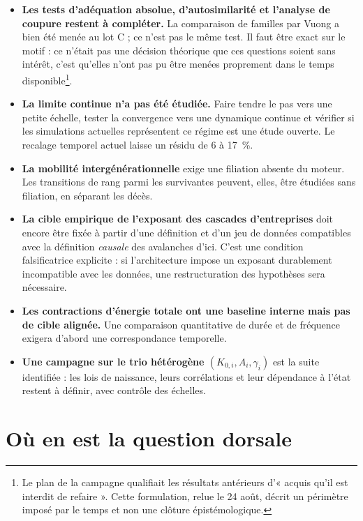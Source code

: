 \documentclass[11pt,a4paper]{article}
\begin{document}
\begin{itemize}
\item \textbf{Les tests d'adéquation absolue, d'autosimilarité et l'analyse
      de coupure restent à compléter.} La comparaison de familles par Vuong
      a bien été menée au lot C ; ce n'est pas le même test. Il faut être
      exact sur le motif : ce n'était pas une décision théorique que ces
      questions soient sans intérêt, c'est qu'elles n'ont pas pu être menées
      proprement dans le temps disponible\footnote{Le plan de la campagne
      qualifiait les résultats antérieurs d'« acquis qu'il est interdit de
      refaire ». Cette formulation, relue le 24 août, décrit un périmètre
      imposé par le temps et non une clôture épistémologique.}.
\item \textbf{La limite continue n'a pas été étudiée.} Faire tendre le pas vers
      une petite échelle, tester la convergence vers une dynamique continue et
      vérifier si les simulations actuelles représentent ce régime est une
      étude ouverte. Le recalage temporel actuel laisse un résidu de 6 à 17~\%.
\item \textbf{La mobilité intergénérationnelle} exige une filiation absente
      du moteur. Les transitions de rang parmi les survivantes peuvent,
      elles, être étudiées sans filiation, en séparant les décès.
\item \textbf{La cible empirique de l'exposant des cascades d'entreprises}
      doit encore être fixée à partir d'une définition et d'un jeu de données
      compatibles avec la définition \emph{causale} des avalanches d'ici. C'est
      une condition falsificatrice explicite : si l'architecture impose un
      exposant durablement incompatible avec les données, une restructuration
      des hypothèses sera nécessaire.
\item \textbf{Les contractions d'énergie totale ont une baseline interne mais
      pas de cible alignée.} Une comparaison quantitative de durée et de
      fréquence exigera d'abord une correspondance temporelle.
\item \textbf{Une campagne sur le trio hétérogène $(K_{0,i},A_i,\gamma_i)$}
      est la suite identifiée : les lois de naissance, leurs corrélations et
      leur dépendance à l'état restent à définir, avec contrôle des échelles.
\end{itemize}



\section{Où en est la question dorsale}
\end{document}
